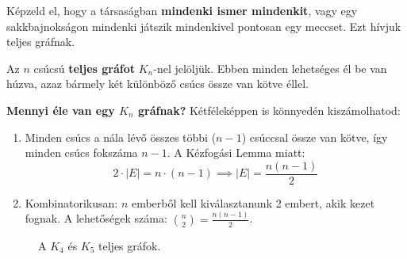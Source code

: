 \documentclass[a4paper,12pt]{article}
\theoremstyle{definition} %
\begin{document}
Képzeld el, hogy a társaságban \textbf{mindenki ismer mindenkit}, vagy egy sakkbajnokságon mindenki játszik mindenkivel pontosan egy meccset. Ezt hívjuk teljes gráfnak.

\begin{definiciodoboz}
Az $n$ csúcsú \textbf{teljes gráfot} $K_n$-nel jelöljük. Ebben minden lehetséges él be van húzva, azaz bármely két különböző csúcs össze van kötve éllel.
\end{definiciodoboz}

\textbf{Mennyi éle van egy $K_n$ gráfnak?}
Kétféleképpen is könnyedén kiszámolhatod:
\begin{enumerate}
    \item Minden csúcs a nála lévő összes többi ($n-1$) csúccsal össze van kötve, így minden csúcs fokszáma $n-1$. A Kézfogási Lemma miatt:
    \[
    2 \cdot |E| = n \cdot (n-1) \implies |E| = \frac{n(n-1)}{2}
    \]
    \item Kombinatorikusan: $n$ emberből kell kiválasztanunk 2 embert, akik kezet fognak. A lehetőségek száma: $\binom{n}{2} = \frac{n(n-1)}{2}$.
\end{enumerate}

\begin{figure}[H]
    \centering
    \caption{A $K_4$ és $K_5$ teljes gráfok.}
    \label{fig:complete_graphs}
\end{figure}
\end{document}
